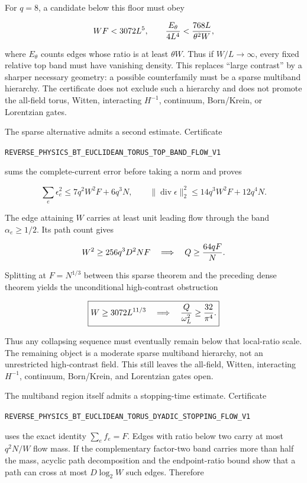 \documentclass[11pt]{article}
\theoremstyle{definition}
\theoremstyle{remark}
\newcommand{\cert}[1]{\nolinkurl{#1}}
\begin{document}
For \(q=8\), a candidate below this floor must obey

\[
 WF<3072L^5,
 \qquad
 {E_\theta\over4L^4}
 <{768L\over\theta^2W},
\]

where \(E_\theta\) counts edges whose ratio is at least
\(\theta W\).  Thus if \(W/L\to\infty\), every fixed relative top band
must have vanishing density.  This replaces ``large contrast'' by a sharper
necessary geometry: a possible counterfamily must be a sparse multiband
hierarchy.  The certificate does not exclude such a hierarchy and does not
promote the all-field torus, Witten, interacting \(H^{-1}\), continuum,
Born/Krein, or Lorentzian gates.

The sparse alternative admits a second estimate.  Certificate

\cert{REVERSE_PHYSICS_BT_EUCLIDEAN_TORUS_TOP_BAND_FLOW_V1}

sums the complete-current error before taking a norm and proves

\[
 \sum_e\epsilon_e^2\leq7q^2W^2F+6q^3N,
 \qquad
 \|\operatorname{div}\epsilon\|_2^2
 \leq14q^3W^2F+12q^4N.
\]

The edge attaining \(W\) carries at least unit leading flow through the
band \(\alpha_e\geq1/2\).  Its path count gives

\[
 W^2\geq256q^3D^2NF
 \quad\Longrightarrow\quad
 Q\geq{64qF\over N}.
\]

Splitting at \(F=N^{1/3}\) between this sparse theorem and the preceding
dense theorem yields the unconditional high-contrast obstruction

\[
 \boxed{
 W\geq3072L^{11/3}
 \quad\Longrightarrow\quad
 {Q\over\omega_L^2}\geq{32\over\pi^4}.}
\]

Thus any collapsing sequence must eventually remain below that local-ratio
scale.  The remaining object is a moderate sparse multiband hierarchy, not
an unrestricted high-contrast field.  This still leaves the all-field,
Witten, interacting \(H^{-1}\), continuum, Born/Krein, and Lorentzian gates
open.

The multiband region itself admits a stopping-time estimate.  Certificate

\cert{REVERSE_PHYSICS_BT_EUCLIDEAN_TORUS_DYADIC_STOPPING_FLOW_V1}

uses the exact identity \(\sum_e f_e=F\).  Edges with ratio below two carry
at most \(q^2N/W\) flow mass.  If the complementary factor-two band carries
more than half the mass, acyclic path decomposition and the endpoint-ratio
bound show that a path can cross at most \(D\log_2W\) such edges.  Therefore
\end{document}
